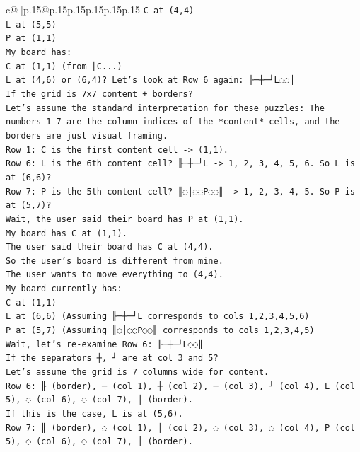 \documentclass{article}
\begin{document}
{\begin{supertabular}{c@{$\;$}|p{.15\linewidth}@{}p{.15\linewidth}p{.15\linewidth}p{.15\linewidth}p{.15\linewidth}p{.15\linewidth}}
{{{\texttt{C at (4,4)} \\
\texttt{L at (5,5)} \\
\texttt{P at (1,1)} \\
\texttt{My board has:} \\
\texttt{C at (1,1) (from ║C...)} \\
\texttt{L at (4,6) or (6,4)? Let's look at Row 6 again: ╟─┼─┘L◌◌║} \\
\texttt{If the grid is 7x7 content + borders?} \\
\texttt{Let's assume the standard interpretation for these puzzles: The numbers 1{-}7 are the column indices of the *content* cells, and the borders are just visual framing.} \\
\texttt{Row 1: C is the first content cell {-}> (1,1).} \\
\texttt{Row 6: L is the 6th content cell? ╟─┼─┘L {-}> 1, 2, 3, 4, 5, 6. So L is at (6,6)?} \\
\texttt{Row 7: P is the 5th content cell? ║◌│◌◌P◌◌║ {-}> 1, 2, 3, 4, 5. So P is at (5,7)?} \\
\texttt{Wait, the user said their board has P at (1,1).} \\
\texttt{My board has C at (1,1).} \\
\texttt{The user said their board has C at (4,4).} \\
\texttt{So the user's board is different from mine.} \\
\texttt{The user wants to move everything to (4,4).} \\
\texttt{My board currently has:} \\
\texttt{C at (1,1)} \\
\texttt{L at (6,6) (Assuming ╟─┼─┘L corresponds to cols 1,2,3,4,5,6)} \\
\texttt{P at (5,7) (Assuming ║◌│◌◌P◌◌║ corresponds to cols 1,2,3,4,5)} \\
\texttt{Wait, let's re{-}examine Row 6: ╟─┼─┘L◌◌║} \\
\texttt{If the separators ┼, ┘ are at col 3 and 5?} \\
\texttt{Let's assume the grid is 7 columns wide for content.} \\
\texttt{Row 6: ╟ (border), ─ (col 1), ┼ (col 2), ─ (col 3), ┘ (col 4), L (col 5), ◌ (col 6), ◌ (col 7), ║ (border).} \\
\texttt{If this is the case, L is at (5,6).} \\
\texttt{Row 7: ║ (border), ◌ (col 1), │ (col 2), ◌ (col 3), ◌ (col 4), P (col 5), ◌ (col 6), ◌ (col 7), ║ (border).} \\
}}}
\end{supertabular}}
\end{document}
